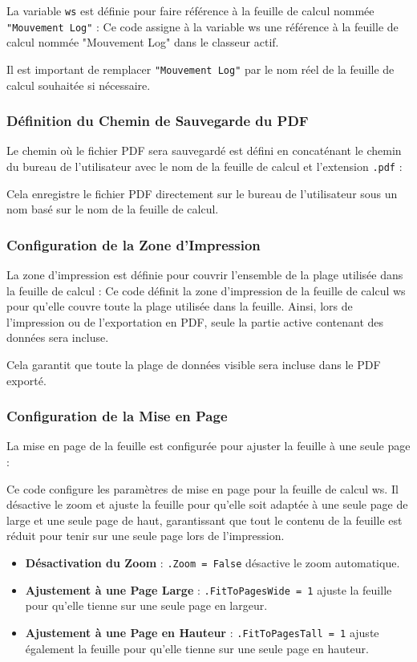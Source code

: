 \documentclass[a4paper, oneside, 12pt, final]{extreport}
\begin{document}
La variable \texttt{ws} est définie pour faire référence à la feuille de calcul nommée \texttt{"Mouvement Log"} :
Ce code assigne à la variable ws une référence à la feuille de calcul nommée "Mouvement Log" dans le classeur actif.

Il est important de remplacer \texttt{"Mouvement Log"} par le nom réel de la feuille de calcul souhaitée si nécessaire.

\subsubsection{Définition du Chemin de Sauvegarde du PDF}

Le chemin où le fichier PDF sera sauvegardé est défini en concaténant le chemin du bureau de l'utilisateur avec le nom de la feuille de calcul et l'extension \texttt{.pdf} :


Cela enregistre le fichier PDF directement sur le bureau de l'utilisateur sous un nom basé sur le nom de la feuille de calcul.

\subsubsection{Configuration de la Zone d'Impression}

La zone d'impression est définie pour couvrir l'ensemble de la plage utilisée dans la feuille de calcul :
Ce code définit la zone d'impression de la feuille de calcul ws pour qu'elle couvre toute la plage utilisée dans la feuille. Ainsi, lors de l'impression ou de l'exportation en PDF, seule la partie active contenant des données sera incluse.

Cela garantit que toute la plage de données visible sera incluse dans le PDF exporté.

\subsubsection{Configuration de la Mise en Page}

La mise en page de la feuille est configurée pour ajuster la feuille à une seule page :

Ce code configure les paramètres de mise en page pour la feuille de calcul ws. Il désactive le zoom et ajuste la feuille pour qu'elle soit adaptée à une seule page de large et une seule page de haut, garantissant que tout le contenu de la feuille est réduit pour tenir sur une seule page lors de l'impression.
\begin{itemize}
    \item \textbf{Désactivation du Zoom} : \texttt{.Zoom = False} désactive le zoom automatique.
    \item \textbf{Ajustement à une Page Large} : \texttt{.FitToPagesWide = 1} ajuste la feuille pour qu'elle tienne sur une seule page en largeur.
    \item \textbf{Ajustement à une Page en Hauteur} : \texttt{.FitToPagesTall = 1} ajuste également la feuille pour qu'elle tienne sur une seule page en hauteur.
\end{itemize}
\end{document}
